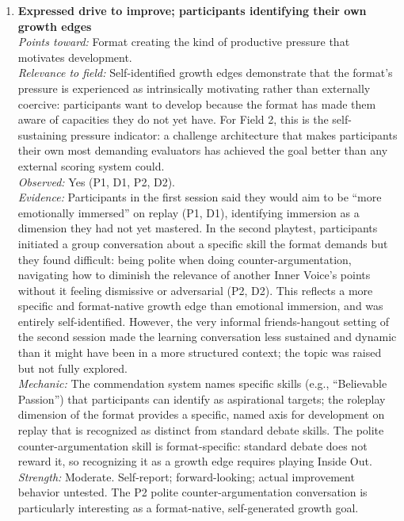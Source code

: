 \documentclass[12pt]{article}
\begin{document}
\begin{enumerate}
\item \textbf{Expressed drive to improve; participants identifying their own growth edges}\\
\textit{Points toward:} Format creating the kind of productive pressure that motivates development.\\
\textit{Relevance to field:} Self-identified growth edges demonstrate that the format's pressure is experienced as intrinsically motivating rather than externally coercive: participants want to develop because the format has made them aware of capacities they do not yet have. For Field 2, this is the self-sustaining pressure indicator: a challenge architecture that makes participants their own most demanding evaluators has achieved the goal better than any external scoring system could.\\
\textit{Observed:} Yes (P1, D1, P2, D2).\\
\textit{Evidence:} Participants in the first session said they would aim to be ``more emotionally immersed'' on replay (P1, D1), identifying immersion as a dimension they had not yet mastered. In the second playtest, participants initiated a group conversation about a specific skill the format demands but they found difficult: being polite when doing counter-argumentation, navigating how to diminish the relevance of another Inner Voice's points without it feeling dismissive or adversarial (P2, D2). This reflects a more specific and format-native growth edge than emotional immersion, and was entirely self-identified. However, the very informal friends-hangout setting of the second session made the learning conversation less sustained and dynamic than it might have been in a more structured context; the topic was raised but not fully explored.\\
\textit{Mechanic:} The commendation system names specific skills (e.g., ``Believable Passion'') that participants can identify as aspirational targets; the roleplay dimension of the format provides a specific, named axis for development on replay that is recognized as distinct from standard debate skills. The polite counter-argumentation skill is format-specific: standard debate does not reward it, so recognizing it as a growth edge requires playing Inside Out.\\
\textit{Strength:} Moderate. Self-report; forward-looking; actual improvement behavior untested. The P2 polite counter-argumentation conversation is particularly interesting as a format-native, self-generated growth goal.

\end{enumerate}
\end{document}
